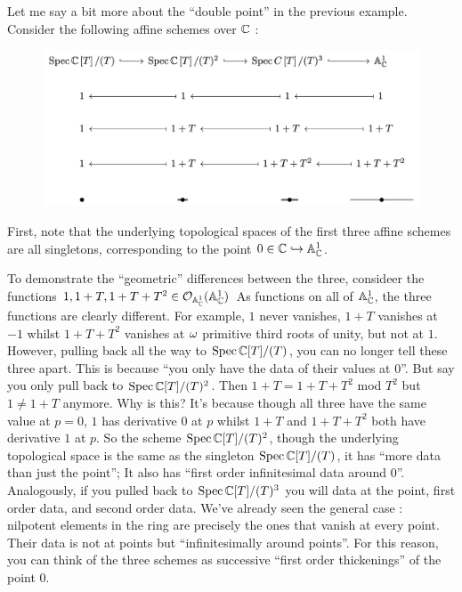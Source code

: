 \begin{eg}[Infinitesimals]
  
  Let me say a bit more about the ``double point'' in the previous example.
  Consider the following affine schemes over $\mathbb{C}$ : 
  \begin{figure}[H]
    \includegraphics[width = 15cm]{infinitesimal.png}
  \end{figure}
  First, note that 
  the underlying topological spaces of the first 
  three affine schemes are all singletons, 
  corresponding to the point $0 \in \mathbb{C} \hookrightarrow \mathbb{A}^1_{\mathbb{C}}$.
  
  To demonstrate the ``geometric'' differences between the three,
  consideer the functions $1, 1 + T, 1 + T + T^2 \in \mathcal{O}_{\mathbb{A}^1_{\mathbb{C}}}(\mathbb{A}^1_{\mathbb{C}})$
  As functions on all of $\mathbb{A}^1_{\mathbb{C}}$,
  the three functions are clearly different.
  For example, $1$ never vanishes,
  $1 + T$ vanishes at $-1$ whilst 
  $1 + T + T^2$ vanishes at $\omega$ primitive third roots of unity, 
  but not at $1$.
  However, pulling back all the way to $\operatorname{Spec} \mathbb{C}[T]/(T)$,
  you can no longer tell these three apart.
  This is because ``you only have the data of their values at $0$''.
  But say you only pull back to $\operatorname{Spec} \mathbb{C}[T]/(T)^2$.
  Then $1 + T = 1 + T + T^2$ mod $T^2$ but 
  $1 \neq 1 + T$ anymore. 
  Why is this? 
  It's because though all three have the same value at $p = 0$,
  $1$ has derivative $0$ at $p$ whilst 
  $1 + T$ and $1 + T + T^2$ both have derivative $1$ at $p$.
  So the scheme $\operatorname{Spec}\mathbb{C}[T]/(T)^2$, 
  though the underlying topological space is the same as 
  the singleton $\operatorname{Spec} \mathbb{C}[T]/(T)$,
  it has ``more data than just the point'';
  It also has ``first order infinitesimal data around $0$''.
  Analogously, 
  if you pulled back to $\operatorname{Spec} \mathbb{C}[T]/(T)^3$
  you will data at the point, first order data, and second order data.
  We've already seen the general case : 
  nilpotent elements in the ring are precisely 
  the ones that vanish at every point. 
  Their data is not at points but ``infinitesimally around points''.
  For this reason,
  you can think of the three schemes as 
  successive ``first order thickenings'' of the point $0$.


\end{eg}
